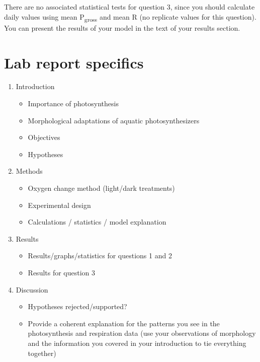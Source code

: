 \documentclass[]{book}
\providecommand{\tightlist}{%
  \setlength{\itemsep}{0pt}\setlength{\parskip}{0pt}}
\theoremstyle{definition}
\theoremstyle{definition}
\theoremstyle{definition}
\theoremstyle{remark}
\begin{document}
There are no associated statistical tests for question 3, since you
should calculate daily values using mean P\textsubscript{gross} and mean
R (no replicate values for this question). You can present the results
of your model in the text of your results section.

\pagebreak

\section{Lab report specifics}\label{lab-report-specifics-1}

\begin{enumerate}
\def\labelenumi{\arabic{enumi}.}
\tightlist
\item
  Introduction

  \begin{itemize}
  \tightlist
  \item
    Importance of photosynthesis
  \item
    Morphological adaptations of aquatic photosynthesizers
  \item
    Objectives
  \item
    Hypotheses
  \end{itemize}
\item
  Methods

  \begin{itemize}
  \tightlist
  \item
    Oxygen change method (light/dark treatments)
  \item
    Experimental design
  \item
    Calculations / statistics / model explanation
  \end{itemize}
\item
  Results

  \begin{itemize}
  \tightlist
  \item
    Results/graphs/statistics for questions 1 and 2
  \item
    Results for question 3
  \end{itemize}
\item
  Discussion

  \begin{itemize}
  \tightlist
  \item
    Hypotheses rejected/supported?
  \item
    Provide a coherent explanation for the patterns you see in the
    photosynthesis and respiration data (use your observations of
    morphology and the information you covered in your introduction to
    tie everything together)
  \end{itemize}
\end{enumerate}
\end{document}
